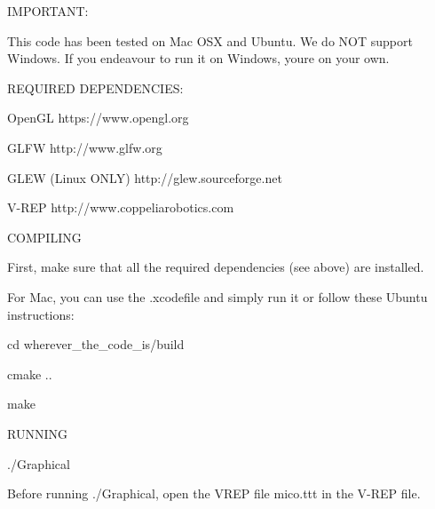 I\+M\+P\+O\+R\+T\+A\+NT\+:

This code has been tested on Mac O\+SX and Ubuntu. We do N\+OT support Windows. If you endeavour to run it on Windows, you\textquotesingle{}re on your own.

R\+E\+Q\+U\+I\+R\+ED D\+E\+P\+E\+N\+D\+E\+N\+C\+I\+ES\+: \begin{DoxyVerb}OpenGL https://www.opengl.org

GLFW http://www.glfw.org

GLEW (Linux ONLY) http://glew.sourceforge.net

V-REP http://www.coppeliarobotics.com
\end{DoxyVerb}


C\+O\+M\+P\+I\+L\+I\+NG

First, make sure that all the required dependencies (see above) are installed.

For Mac, you can use the .xcodefile and simply run it or follow these Ubuntu instructions\+: \begin{DoxyVerb}cd wherever_the_code_is/build

cmake ..

make
\end{DoxyVerb}


R\+U\+N\+N\+I\+NG \begin{DoxyVerb}./Graphical
\end{DoxyVerb}


Before running ./\+Graphical, open the V\+R\+EP file mico.\+ttt in the V-\/\+R\+EP file. 